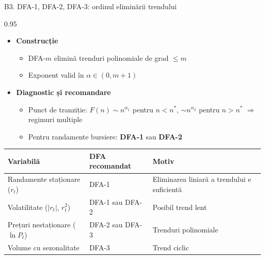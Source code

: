 \documentclass[9pt, aspectratio=169, t]{beamer}
\begin{document}
\begin{frame}[shrink=15]{B3. DFA-1, DFA-2, DFA-3: ordinul eliminării trendului}
\begin{cminipage}{0.95\textwidth}
\begin{itemize}\setlength{\itemsep}{2pt}
    \item \textbf{Construcție}
    \begin{itemize}\setlength{\itemsep}{0pt}
        \item DFA-$m$ elimină trenduri polinomiale de grad $\leq m$
        \item Exponent valid în $\alpha\in(0,m+1)$
    \end{itemize}
    \item \textbf{Diagnostic și recomandare}
    \begin{itemize}\setlength{\itemsep}{0pt}
        \item Punct de tranziție: $F(n)\sim n^{\alpha_1}$ pentru $n<n^*$, $\sim n^{\alpha_2}$ pentru $n>n^*$ $\Rightarrow$ regimuri multiple
        \item Pentru randamente bursiere: \textbf{DFA-1} sau \textbf{DFA-2}
    \end{itemize}
\end{itemize}
\vspace{0.1cm}
\renewcommand{\arraystretch}{1.2}
\centering
\small
\begin{tabular}{lll}
\toprule
\textbf{Variabilă} & \textbf{DFA recomandat} & \textbf{Motiv} \\
\midrule
Randamente staționare ($r_t$) & DFA-1 & Eliminarea liniară a trendului e suficientă \\
Volatilitate ($|r_t|$, $r_t^2$) & DFA-1 sau DFA-2 & Posibil trend lent \\
Prețuri nestaționare ($\ln P_t$) & DFA-2 sau DFA-3 & Trenduri polinomiale \\
Volume cu sezonalitate & DFA-3 & Trend ciclic \\
\bottomrule
\end{tabular}
\end{cminipage}
\end{frame}
\end{document}
